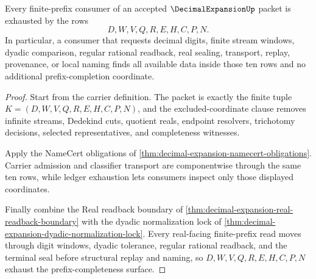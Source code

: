 \begin{theorem}
\label{thm:decimal-expansion-finite-prefix-completeness}
Every finite-prefix consumer of an accepted $\DecimalExpansionUp$ packet is exhausted by the rows
$$
D,W,V,Q,R,E,H,C,P,N .
$$
In particular, a consumer that requests decimal digits, finite stream windows, dyadic comparison, regular rational readback, real sealing, transport, replay, provenance, or local naming finds all available data inside those ten rows and no additional prefix-completion coordinate.
\end{theorem}
\begin{proof}
Start from the carrier definition. The packet is exactly the finite tuple $K=(D,W,V,Q,R,E,H,C,P,N)$, and the excluded-coordinate clause removes infinite streams, Dedekind cuts, quotient reals, endpoint resolvers, trichotomy decisions, selected representatives, and completeness witnesses.

Apply the NameCert obligations of \autoref{thm:decimal-expansion-namecert-obligations}. Carrier admission and classifier transport are componentwise through the same ten rows, while ledger exhaustion lets consumers inspect only those displayed coordinates.

Finally combine the Real readback boundary of \autoref{thm:decimal-expansion-real-readback-boundary} with the dyadic normalization lock of \autoref{thm:decimal-expansion-dyadic-normalization-lock}. Every real-facing finite-prefix read moves through digit windows, dyadic tolerance, regular rational readback, and the terminal seal before structural replay and naming, so $D,W,V,Q,R,E,H,C,P,N$ exhaust the prefix-completeness surface.
\end{proof}

